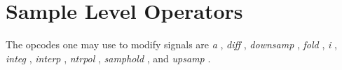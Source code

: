 \begin{comment}
\documentclass[10pt]{article}
\usepackage{fullpage, graphicx, url}
\setlength{\parskip}{1ex}
\setlength{\parindent}{0ex}
\title{Sample Level Operators}



\begin{tabular}{ccc}
The Alternative Csound Reference Manual & & \\
Previous &Signal Modifiers &Next

\end{tabular}

\end{comment}
\section{Sample Level Operators}


  The opcodes one may use to modify signals are \emph{a}
, \emph{diff}
, \emph{downsamp}
, \emph{fold}
, \emph{i}
, \emph{integ}
, \emph{interp}
, \emph{ntrpol}
, \emph{samphold}
, and \emph{upsamp}
. 


\begin{comment}
\begin{tabular}{lcr}
Previous &Home &Next \\
Reverberation &Up &Signal Limiters

\end{tabular}



\end{comment}
